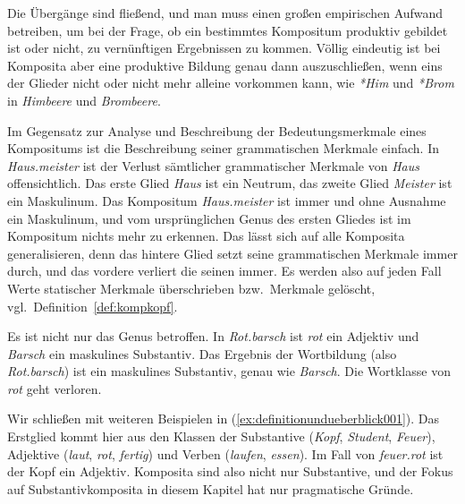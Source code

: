 Die Übergänge sind fließend, und man muss einen großen empirischen Aufwand betreiben, um bei der Frage, ob ein bestimmtes Kompositum produktiv gebildet ist oder nicht, zu vernünftigen Ergebnissen zu kommen.
Völlig eindeutig ist bei Komposita aber eine produktive Bildung genau dann auszuschließen, wenn eins der Glieder nicht oder nicht mehr alleine vorkommen kann, wie \textit{*Him} und \textit{*Brom} in \textit{Himbeere} und \textit{Brombeere}.

Im Gegensatz zur Analyse und Beschreibung der Bedeutungsmerkmale eines Kompositums ist die Beschreibung seiner grammatischen Merkmale einfach.
In \textit{Haus.meister} ist \zB der Verlust sämtlicher grammatischer Merkmale von \textit{Haus} offensichtlich.
Das erste Glied \textit{Haus} ist \zB ein Neutrum, das zweite Glied \textit{Meister} ist ein Maskulinum.
Das Kompositum \textit{Haus.meister} ist immer und ohne Ausnahme ein Maskulinum, und vom ursprünglichen Genus des ersten Gliedes ist im Kompositum nichts mehr zu erkennen.
Das lässt sich auf alle Komposita generalisieren, denn das hintere Glied setzt seine grammatischen Merkmale immer durch, und das vordere verliert die seinen immer.
Es werden also auf jeden Fall Werte statischer Merkmale überschrieben bzw.\ Merkmale gelöscht, vgl.\ Definition~\ref{def:kompkopf}.


Es ist nicht nur das Genus betroffen.
In \textit{Rot.barsch} ist \textit{rot} ein Adjektiv und \textit{Barsch} ein maskulines Substantiv.
Das Ergebnis der Wortbildung (also \textit{Rot.barsch}) ist ein maskulines Substantiv, genau wie \textit{Barsch}.
Die Wortklasse von \textit{rot} geht verloren.

Wir schließen mit weiteren Beispielen in (\ref{ex:definitionundueberblick001}).
Das Erstglied kommt hier aus den Klassen der Substantive (\textit{Kopf}, \textit{Student}, \textit{Feuer}), Adjektive (\textit{laut}, \textit{rot}, \textit{fertig}) und Verben (\textit{laufen}, \textit{essen}).
Im Fall von \textit{feuer.rot} ist der Kopf ein Adjektiv.
Komposita sind also nicht nur Substantive, und der Fokus auf Substantivkomposita in diesem Kapitel hat nur pragmatische Gründe.

\begin{exe}
  \ex\label{ex:definitionundueberblick001}
  \begin{xlist}
  \end{xlist}
\end{exe}

